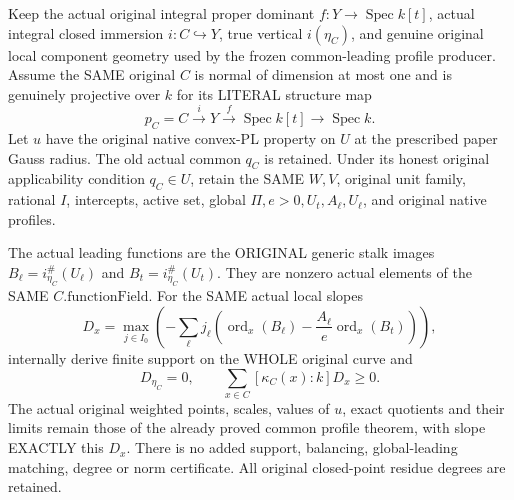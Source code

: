 \begin{theorem}
\label{thm:gauss-common-leading-original-degree-nonnegative}
\leanok
Keep the actual original integral proper dominant
$f:Y\to\operatorname{Spec}k[t]$, actual integral closed immersion
$i:C\hookrightarrow Y$, true vertical $i(\eta_C)$, and genuine original
local component geometry used by the frozen common-leading profile
producer. Assume the SAME original $C$ is normal of dimension at most
one and is genuinely projective over $k$ for its LITERAL structure map
\[
 p_C=C\xrightarrow{i}Y\xrightarrow{f}\operatorname{Spec}k[t]
                \longrightarrow\operatorname{Spec}k.
\]
Let $u$ have the original native convex-PL property on $U$ at the prescribed
paper Gauss radius. The old actual common $q_C$ is retained. Under its
honest original applicability condition $q_C\in U$, retain the SAME
$W,V$, original unit family, rational $I$, intercepts, active set,
global $\Pi,e>0,U_t,A_\ell,U_\ell$, and original native profiles.

The actual leading functions are the ORIGINAL generic stalk images
$B_\ell=i^\#_{\eta_C}(U_\ell)$ and $B_t=i^\#_{\eta_C}(U_t)$.
They are nonzero actual elements of the SAME $C.\mathrm{functionField}$.
For the SAME actual local slopes
\[
 D_x=\max_{j\in I_0}
       \left(-\sum_\ell j_\ell\left(
        \operatorname{ord}_x(B_\ell)
          -\frac{A_\ell}{e}\operatorname{ord}_x(B_t)\right)\right),
\]
internally derive finite support on the WHOLE original curve and
\[
 D_{\eta_C}=0,\qquad
 \sum_{x\in C}[\kappa_C(x):k]D_x\ge0.
\]
The actual original weighted points, scales, values of $u$, exact
quotients and their limits remain those of the already proved common
profile theorem, with slope EXACTLY this $D_x$. There is no added
support, balancing, global-leading matching, degree or norm certificate.
All original closed-point residue degrees are retained.
\end{theorem}
